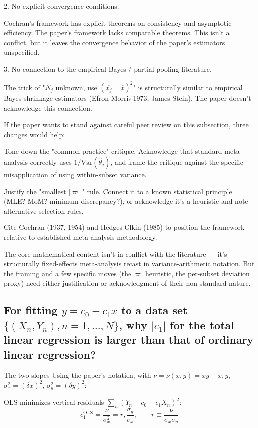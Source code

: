 \documentclass[twoside]{article}
\numberwithin{equation}{section}
\begin{document}
2. No explicit convergence conditions.

Cochran's framework has explicit theorems on consistency and asymptotic efficiency. The paper's framework lacks comparable theorems. This isn't a conflict, but it leaves the convergence behavior of the paper's estimators unspecified.

3. No connection to the empirical Bayes / partial-pooling literature.

The trick of "$N_j$ unknown, use $(\overline{x_j} - \overline{x})^2$" is structurally similar to empirical Bayes shrinkage estimators (Efron-Morris 1973, James-Stein). The paper doesn't acknowledge this connection.

If the paper wants to stand against careful peer review on this subsection, three changes would help:

Tone down the "common practice" critique. Acknowledge that standard meta-analysis correctly uses $1/\mathrm{Var}(\hat\theta_j)$, and frame the critique against the specific misapplication of using within-subset variance.

Justify the "smallest $|\varpi|$" rule. Connect it to a known statistical principle (MLE? MoM? minimum-discrepancy?), or acknowledge it's a heuristic and note alternative selection rules.

Cite Cochran (1937, 1954) and Hedges-Olkin (1985) to position the framework relative to established meta-analysis methodology.

The core mathematical content isn't in conflict with the literature — it's structurally fixed-effects meta-analysis recast in variance-arithmetic notation. But the framing and a few specific moves (the $\varpi$ heuristic, the per-subset deviation proxy) need either justification or acknowledgment of their non-standard nature.


\subsection{For fitting $y= c_0 + c_1 x$ to a data set $\{(X_n, Y_n), n=1,\dots, N\}$, why $|c_1|$ for the total linear regression is larger than that of ordinary linear regression?}

The two slopes
Using the paper's notation, with $\nu = \nu(x,y) = \overline{xy} - \overline{x},\overline{y}$, $\sigma_x^2 = (\delta x)^2$, $\sigma_y^2 = (\delta y)^2$:

OLS minimizes vertical residuals $\sum_n (Y_n - c_0 - c_1 X_n)^2$:
$$c_1^{\text{OLS}} = \frac{\nu}{\sigma_x^2} = r,\frac{\sigma_y}{\sigma_x}, \qquad r \equiv \frac{\nu}{\sigma_x \sigma_y}$$
\end{document}

